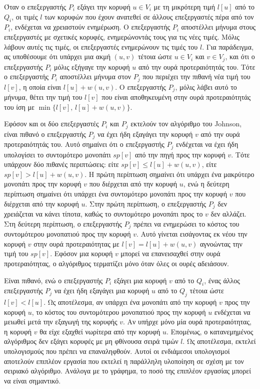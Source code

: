 \documentclass[12pt,a4paper]{article}
\begin{document}
Όταν ο επεξεργαστής $P_i$ εξάγει την κορυφή $u \in V_i$ με τη μικρότερη
τιμή $l[u]$ από το $Q_i$, οι τιμές $l$ των κορυφών που έχουν ανατεθεί σε
άλλους επεξεργαστές πέρα από τον $P_i$, ενδέχεται να χρειαστούν ενημέρωση. Ο επεξεργαστής
$P_i$ αποστέλλει μήνυμα στους επεξεργαστές με σχετικές κορυφές,
ενημερώνοντάς τους για τις νέες τιμές. Μόλις λάβουν αυτές τις τιμές,
οι επεξεργαστές ενημερώνουν τις τιμές του $l$. Για παράδειγμα, ας
υποθέσουμε ότι υπάρχει μια ακμή $(u, v)$ τέτοια ώστε $u \in V_i$ και
$v \in V_j$, και ότι ο επεξεργαστής $P_i$ μόλις εξήγαγε την κορυφή $u$
από την ουρά προτεραιότητάς του. Τότε ο επεξεργαστής $P_i$ αποστέλλει
μήνυμα στον $P_j$ που περιέχει την πιθανή νέα τιμή του $l[v]$, η οποία
είναι $l[u] + w(u, v)$. Ο επεξεργαστής $P_j$, μόλις λάβει αυτό το
μήνυμα, θέτει την τιμή του $l[v]$ που είναι αποθηκευμένη στην ουρά
προτεραιότητάς του ίση με $\min\{l[v],\, l[u] + w(u, v)\}$.

Εφόσον και οι δύο επεξεργαστές $P_i$ και $P_j$ εκτελούν τον αλγόριθμο
του \foreignlanguage{english}{Johnson}, είναι πιθανό ο επεξεργαστής $P_j$ να έχει ήδη εξαγάγει
την κορυφή $v$ από την ουρά προτεραιότητάς του. Αυτό σημαίνει ότι ο
επεξεργαστής $P_j$ ενδέχεται να έχει ήδη υπολογίσει το συντομότερο
μονοπάτι $sp[v]$ από την πηγή προς την κορυφή $v$. Τότε υπάρχουν δύο
πιθανές περιπτώσεις: είτε $sp[v] \leq l[u] + w(u, v)$, είτε $sp[v] >
l[u] + w(u, v)$. Η πρώτη περίπτωση σημαίνει ότι υπάρχει ένα μακρύτερο
μονοπάτι προς την κορυφή $v$ που διέρχεται από την κορυφή $u$, ενώ η
δεύτερη περίπτωση σημαίνει ότι υπάρχει ένα συντομότερο μονοπάτι προς
την κορυφή $v$ που διέρχεται από την κορυφή $u$. Στην πρώτη περίπτωση,
ο επεξεργαστής $P_j$ δεν χρειάζεται να κάνει τίποτα, καθώς το
συντομότερο μονοπάτι προς το $v$ δεν αλλάζει. Στη δεύτερη περίπτωση,
ο επεξεργαστής $P_j$ πρέπει να ενημερώσει το κόστος του συντομότερου
μονοπατιού προς την κορυφή $v$. Αυτό γίνεται εισάγοντας εκ νέου την
κορυφή $v$ στην ουρά προτεραιότητας με $l[v] = l[u] + w(u, v)$ 
αγνοώντας την τιμή του $sp[v]$. Εφόσον μια
κορυφή $v$ μπορεί να επανεισαχθεί στην ουρά προτεραιότητας, ο
αλγόριθμος τερματίζει μόνο όταν όλες οι ουρές αδειάσουν.

Είναι πιθανό, ενώ ο επεξεργαστής $P_i$ εξάγει μια κορυφή $v$ από το
$Q_i$, ένας άλλος επεξεργαστής $P_j$ να έχει ήδη εξαγάγει μια κορυφή
$u$ από το $Q_j$ τέτοια ώστε $l[v] < l[u]$. Ως αποτέλεσμα, αν υπάρχει
ένα μονοπάτι από την κορυφή $v$ προς την κορυφή $u$, το κόστος του
συντομότερου μονοπατιού προς την κορυφή $u$ ενδέχεται να μειωθεί μετά
την εξαγωγή της κορυφής $v$. Αν υπήρχε μόνο μία ουρά προτεραιότητας,
η κορυφή $v$ θα είχε εξαχθεί νωρίτερα από την κορυφή $u$. Επομένως,
ο κατανεμημένος αλγόριθμος δεν εξάγει κορυφές με μη φθίνουσα σειρά
τιμών $l$. Ως αποτέλεσμα, εκτελεί υπολογισμούς που πρέπει να
επαναληφθούν. Αυτοί οι ενδιάμεσοι υπολογισμοί αποτελούν επιπλέον
εργασία που εκτελεί η παράλληλη υλοποίηση σε σχέση με τον σειριακό
αλγόριθμο. Ανάλογα με το γράφημα, το ποσό της επιπλέον εργασίας μπορεί
να είναι σημαντικό.
\end{document}
